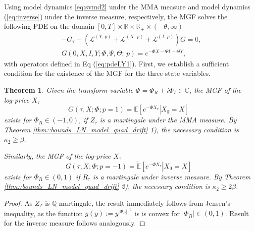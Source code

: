 \documentclass[11pt,a4paper] {article}
\newtheorem{theorem}{Theorem}[section]
\begin{document}
Using model dynamics \eqref{eq:svmd2} under the MMA measure and model dynamics (\ref{eq:inverse}) under the inverse measure, respectively, the MGF solves the following PDE on the domain $[0,T]\times\mathbb{R}\times\mathbb{R}_{+}\times (-\theta,\infty)$
\begin{equation} \label{eq:mgf1}
\begin{split}
&-G_{\tau}  +\left( \mathcal{L}^{(Y;\,p)} + \mathcal{L}^{(X;\,p)} + \mathcal{L}^{(I;\,p)} \right)G=0,\\
&  G(0,X,I,Y; \Phi,\Psi,\Theta;\,p) = e^{-\Phi X-\Psi I-\Theta Y},
\end{split}
\end{equation}
with operators defined in Eq (\ref{eq:pdeLY1}). First, we establish a sufficient condition for the existence of the MGF for the three state variables. 
\begin{theorem}\label{thm::existence_MGF_X}
Given the transform variable $\Phi=\Phi_R+i\Phi_I\in \mathbb{C}$, the MGF of the log-price $X_\tau$
\begin{equation*}
G(\tau,X;\Phi;p=1)=\mathbb{E}[\left. e^{-\Phi X_\tau}\right|X_0=X]
\end{equation*}
exists for $\Phi_R\in (-1,0)$, if $Z_\tau$ is a martingale under the MMA measure. By Theorem \ref{thm::bounds_LN_model_quad_drift} 1), the necessary condition is $\kappa_2\ge \beta$.


Similarly, the MGF of the log-price $X_\tau$
\begin{equation*}
G(\tau,X;\Phi;p=-1)=\tilde{\mathbb{E}}[\left. e^{-\Phi X_\tau}\right|X_0=X]
\end{equation*}
exists for $\Phi_R\in (0,1)$ if $R_\tau$ is a martingale under inverse measure. By Theorem \ref{thm::bounds_LN_model_quad_drift} 2), the necessary condition is $\kappa_2\ge 2\beta$. 
\end{theorem}
%
\begin{proof}
As $Z_T$ is $\mathbb{Q}$-martingale, the result immediately follows from Jensen's inequality, as the function $g(y):=y^{|\Phi_R|^{-1}}$ is is convex for $|\Phi_R|\in (0,1)$. Result for the inverse measure follows analogously. 
\end{proof}
\end{document}
